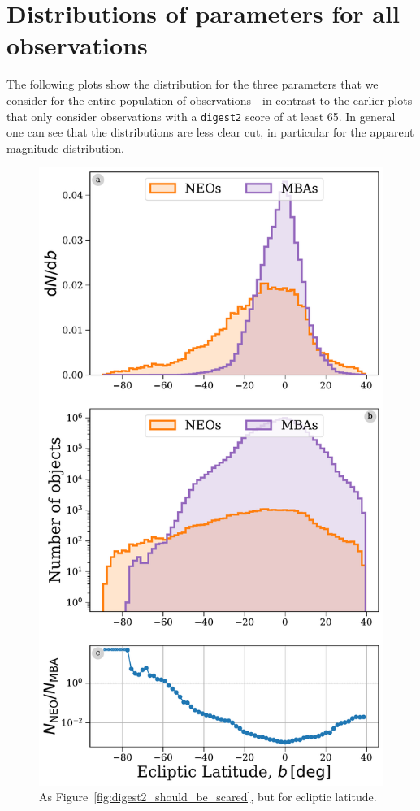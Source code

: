 \documentclass[twocolumn, twocolappendix]{aastex631}
\newcommand{\dig}{\texttt{digest2}}
\begin{document}
\appendix

\section{Distributions of parameters for all observations}

The following plots show the distribution for the three parameters that we consider for the entire population of observations - in contrast to the earlier plots that only consider observations with a \dig{} score of at least 65. In general one can see that the distributions are less clear cut, in particular for the apparent magnitude distribution.

\begin{figure}[htb]
    \centering
    \includegraphics[width=\columnwidth]{figures/ecliptic_latitude_dist_all.pdf}
    \caption{As Figure~\ref{fig:digest2_should_be_scared}, but for ecliptic latitude.}
    \label{fig:ecl_lat_all}
\end{figure}
\end{document}
